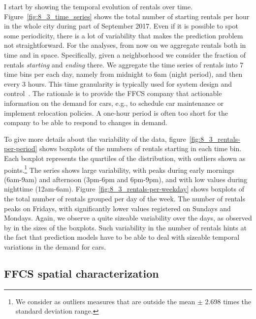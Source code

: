 I start by showing the temporal evolution of rentals over time.  Figure~\ref{fig:8_3_time_series} shows the total number of starting rentals per hour in the whole city during part of September 2017. Even if it is possible to spot some periodicity, there is a lot of variability that makes the prediction problem not straightforward. 
For the analyses, from now on we aggregate rentals both in time and in space. Specifically, given a neighborhood we consider the fraction of rentals \textit{starting} and \textit{ending} there. We aggregate the time series of rentals into 7 time bins per each day, namely from midnight to 6am (night period), and then every 3 hours. 
This time granularity is typically used for system design and control~\citep{schmoller2015empirical}. The rationale is to provide the FFCS company that actionable information on the demand for cars, e.g., to schedule car maintenance or implement relocation policies. A one-hour period is often too short for the company to be able to respond to changes in demand.

To give more details about the variability of the data, figure~\ref{fig:8_3_rentals-per-period} shows boxplots of the  numbers of rentals starting in each time bin. 
Each boxplot represents the quartiles of the distribution, with outliers shown as points.\footnote{We consider as outliers measures that are outside the mean $\pm$ 2.698 times the standard deviation range.} 
The series shows large variability, with peaks during early mornings (6am-9am) and afternoon (3pm-6pm and 6pm-9pm), and with low values during nighttime (12am-6am). 
Figure~\ref{fig:8_3_rentals-per-weekday} shows boxplots of the total number of rentals grouped per day of the week. The number of rentals peaks on Fridays, with significantly lower values registered on Sundays and Mondays. 
Again, we observe a quite sizeable variability over the days, as observed by in the sizes of the boxplots. 
Such variability in the number of rentals hints at the fact that prediction models have to be able to deal with sizeable temporal variations in the demand for cars.

\subsection{FFCS spatial characterization}

